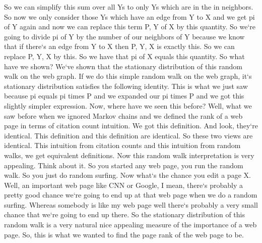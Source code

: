 So we can simplify this sum over all Ys to only Ys which are in the in neighbors.
So now we only consider those Ys which have an edge from Y to X and we get pi of Y again and now we can replace this term P, Y of X by this quantity.
So we`re going to divide pi of Y by the number of our neighbors of Y because we know that if there`s an edge from Y to X then P, Y, X is exactly this.
So we can replace P, Y, X by this.
So we have that pi of X equals this quantity.
So what have we shown? We`ve shown that the stationary distribution of this random walk on the web graph.
If we do this simple random walk on the web graph, it`s stationary distribution satisfies the following identity.
This is what we just saw because pi equals pi times P and we expanded our pi times P and we got this slightly simpler expression.
Now, where have we seen this before? Well, what we saw before when we ignored Markov chains and we defined the rank of a web page in terms of citation count intuition.
We got this definition.
And look, they`re identical.
This definition and this definition are identical.
So these two views are identical.
This intuition from citation counts and this intuition from random walks, we get equivalent definitions.
Now this random walk interpretation is very appealing.
Think about it.
So you started any web page, you run the random walk.
So you just do random surfing.
Now what`s the chance you edit a page X\@.
Well, an important web page like CNN or Google, I mean, there`s probably a pretty good chance we`re going to end up at that web page when we do a random surfing.
Whereas somebody is like my web page well there`s probably a very small chance that we`re going to end up there.
So the stationary distribution of this random walk is a very natural nice appealing measure of the importance of a web page.
So, this is what we wanted to find the page rank of the web page to be.


